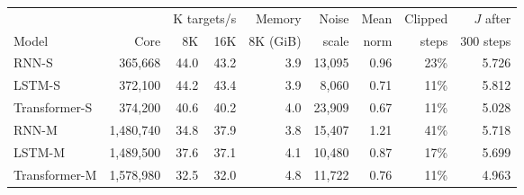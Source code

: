\begin{tabular}{@{}lrrrrrrrr@{}}
\toprule
 & & \multicolumn{2}{c}{K targets/s} & Memory & Noise & Mean & Clipped & $J$ after \\
\cmidrule(lr){3-4}
Model & Core & 8K & 16K & 8K (GiB) & scale & norm & steps & 300 steps \\
\midrule
RNN-S & 365,668 & 44.0 & 43.2 & 3.9 & 13,095 & 0.96 & 23\% & 5.726 \\
LSTM-S & 372,100 & 44.2 & 43.4 & 3.9 & 8,060 & 0.71 & 11\% & 5.812 \\
Transformer-S & 374,200 & 40.6 & 40.2 & 4.0 & 23,909 & 0.67 & 11\% & 5.028 \\
RNN-M & 1,480,740 & 34.8 & 37.9 & 3.8 & 15,407 & 1.21 & 41\% & 5.718 \\
LSTM-M & 1,489,500 & 37.6 & 37.1 & 4.1 & 10,480 & 0.87 & 17\% & 5.699 \\
Transformer-M & 1,578,980 & 32.5 & 32.0 & 4.8 & 11,722 & 0.76 & 11\% & 4.963 \\
\bottomrule
\end{tabular}
